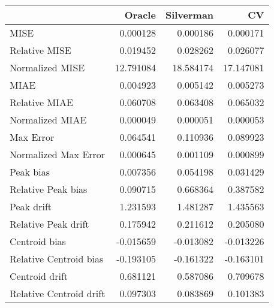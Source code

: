 \begin{tabular}{lrrr}
  \hline
 & Oracle & Silverman & CV \\ 
  \hline
MISE & 0.000128 & 0.000186 & 0.000171 \\ 
  Relative MISE & 0.019452 & 0.028262 & 0.026077 \\ 
  Normalized MISE & 12.791084 & 18.584174 & 17.147081 \\ 
  MIAE & 0.004923 & 0.005142 & 0.005273 \\ 
  Relative MIAE & 0.060708 & 0.063408 & 0.065032 \\ 
  Normalized MIAE & 0.000049 & 0.000051 & 0.000053 \\ 
  Max Error & 0.064541 & 0.110936 & 0.089923 \\ 
  Normalized Max Error & 0.000645 & 0.001109 & 0.000899 \\ 
  Peak bias & 0.007356 & 0.054198 & 0.031429 \\ 
  Relative Peak bias & 0.090715 & 0.668364 & 0.387582 \\ 
  Peak drift & 1.231593 & 1.481287 & 1.435563 \\ 
  Relative Peak drift & 0.175942 & 0.211612 & 0.205080 \\ 
  Centroid bias & -0.015659 & -0.013082 & -0.013226 \\ 
  Relative Centroid bias & -0.193105 & -0.161322 & -0.163101 \\ 
  Centroid drift & 0.681121 & 0.587086 & 0.709678 \\ 
  Relative Centroid drift & 0.097303 & 0.083869 & 0.101383 \\ 
   \hline
\end{tabular}

